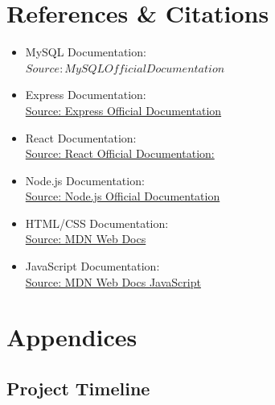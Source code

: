 \documentclass[a4paper, 12pt]{article}
\begin{document}
\section{References \& Citations}
\begin{itemize}
    \item MySQL Documentation:\\
    \href{https://dev.mysql.com/doc/}{$Source: MySQL Official Documentation$}
    \item Express Documentation:\\
    \href{http://expressjs.com/}{Source: Express Official Documentation}
    \item React Documentation:\\
    \href{https://legacy.reactjs.org/}{Source: React Official Documentation:}
    \item Node.js Documentation:\\
    \href{https://nodejs.org/en/docs}{Source: Node.js Official Documentation}
    \item HTML/CSS Documentation:\\
    \href{https://developer.mozilla.org/en-US/}{Source: MDN Web Docs}
    \item JavaScript Documentation:\\
    \href{https://developer.mozilla.org/en-US/docs/Web/javascript}{Source: MDN Web Docs JavaScript}
\end{itemize}

\newpage
\section{Appendices}
\subsection{Project Timeline}
\end{document}
